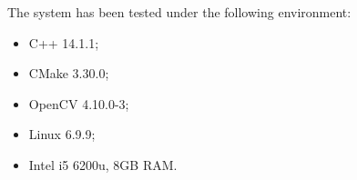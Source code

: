 The system has been tested under the following environment:
\begin{itemize}
    \item C++ 14.1.1;
    \item CMake 3.30.0;
    \item OpenCV 4.10.0-3;
    \item Linux 6.9.9;
    \item Intel i5 6200u, 8GB RAM.
\end{itemize}